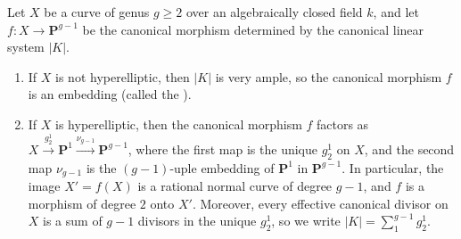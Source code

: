 Let $X$ be a curve of genus $g \geqslant 2$ over an algebraically closed field $k$, and let $f: X \to \mathbf{P}^{g-1}$ be the canonical morphism determined by the canonical linear system $|K|$.

\begin{enumerate}
\item If $X$ is not hyperelliptic, then $|K|$ is very ample, so the canonical morphism $f$ is an embedding (called the ).
\item If $X$ is hyperelliptic, then the canonical morphism $f$ factors as $X \xrightarrow{g_2^1} \mathbf{P}^1 \xrightarrow{\nu_{g-1}} \mathbf{P}^{g-1}$, where the first map is the unique $g_2^1$ on $X$, and the second map $\nu_{g-1}$ is the $(g-1)$-uple embedding of $\mathbf{P}^1$ in $\mathbf{P}^{g-1}$. In particular, the image $X' = f(X)$ is a rational normal curve of degree $g-1$, and $f$ is a morphism of degree $2$ onto $X'$. Moreover, every effective canonical divisor on $X$ is a sum of $g-1$ divisors in the unique $g_2^1$, so we write $|K| = \sum_{1}^{g-1} g_2^1$.
\end{enumerate}
